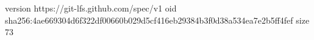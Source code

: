version https://git-lfs.github.com/spec/v1
oid sha256:4ae669304d6f322df00660b029d5cf416eb29384b3f0d38a534ea7e2b5ff4fef
size 73
